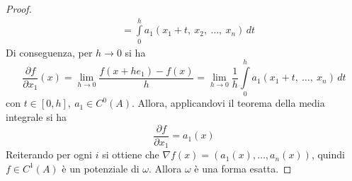 \begin{proof}
\begin{equation*}
\begin{aligned}
    &=\int\limits_{0}^{h}{a_1(x_1+t,\ x_2,\ \dots,\  x_n)}\, dt
\end{aligned}
\end{equation*}
Di conseguenza, per $h \to 0$ si ha  
\begin{equation*}
    \frac{\partial{f}}{\partial x_1}{(x)}= \lim_{h\to 0}{\frac{f(x+he_1)-f(x)}{h}}= \lim_{h \to 0} \frac{1}{h}{\int\limits_{0}^{h}{a_1(x_1+t,\ \dots,\ x_n)}\, dt}
\end{equation*}
con $t \in [0, h],\ a_1 \in C^0(A)$. Allora, applicandovi il teorema della media integrale si ha 
\begin{equation*}    
     \frac{\partial{f}}{\partial x_1}=a_1(x)
\end{equation*}
Reiterando per ogni $i$ si ottiene che $\nabla f(x)= (a_1(x), \dots, a_n(x))$, quindi $f \in C^1(A)$ è un potenziale di $\omega$. Allora $\omega$ è una forma esatta. 
\end{proof}
